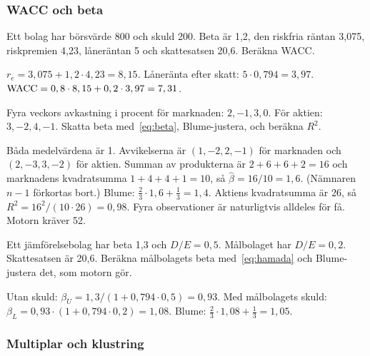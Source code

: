 \subsubsection*{WACC och beta}

\begin{ovning}
Ett bolag har börsvärde 800 och skuld 200. Beta är 1,2, den riskfria räntan 3,075\pct,
riskpremien 4,23\pct, låneräntan 5\pct{} och skattesatsen 20,6\pct. Beräkna WACC.
\end{ovning}
\begin{losning}
$r_e = 3,075 + 1,2 \cdot 4,23 = 8,15$\pct. Låneränta efter skatt: $5 \cdot 0,794 = 3,97$\pct.
$\mathrm{WACC} = 0,8 \cdot 8,15 + 0,2 \cdot 3,97 = 7,31$\pct.
\end{losning}

\begin{ovning}
Fyra veckors avkastning i procent för marknaden: $2, -1, 3, 0$. För aktien:
$3, -2, 4, -1$. Skatta beta med~\eqref{eq:beta}, Blume-justera, och beräkna $R^2$.
\end{ovning}
\begin{losning}
Båda medelvärdena är 1. Avvikelserna är $(1, -2, 2, -1)$ för marknaden och $(2, -3, 3, -2)$
för aktien. Summan av produkterna är $2 + 6 + 6 + 2 = 16$ och marknadens kvadratsumma
$1 + 4 + 4 + 1 = 10$, så $\hat\beta = 16/10 = 1,6$. (Nämnaren $n - 1$ förkortas bort.)
Blume: $\tfrac23 \cdot 1,6 + \tfrac13 = 1,4$. Aktiens kvadratsumma är 26, så
$R^2 = 16^2 / (10 \cdot 26) = 0,98$. Fyra observationer är naturligtvis alldeles för få. Motorn
kräver 52.
\end{losning}

\begin{ovning}
Ett jämförelsebolag har beta 1,3 och $D/E = 0,5$. Målbolaget har $D/E = 0,2$. Skattesatsen är
20,6\pct. Beräkna målbolagets beta med~\eqref{eq:hamada} och Blume-justera det, som motorn gör.
\end{ovning}
\begin{losning}
Utan skuld: $\beta_U = 1,3 / (1 + 0,794 \cdot 0,5) = 0,93$. Med målbolagets skuld:
$\beta_L = 0,93 \cdot (1 + 0,794 \cdot 0,2) = 1,08$. Blume:
$\tfrac23 \cdot 1,08 + \tfrac13 = 1,05$.
\end{losning}

\subsubsection*{Multiplar och klustring}

